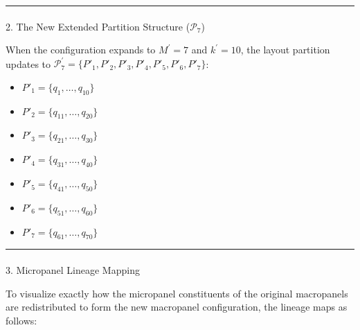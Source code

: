 \documentclass[
  number]{elsarticle}
\makeatletter
\let\oldparagraph\paragraph
\renewcommand{\paragraph}{
    \@ifstar
      \xxxParagraphStar
      \xxxParagraphNoStar
  }
\newcommand{\xxxParagraphStar}[1]{\oldparagraph*{#1}\mbox{}}
\newcommand{\xxxParagraphNoStar}[1]{\oldparagraph{#1}\mbox{}}
\providecommand{\tightlist}{%
  \setlength{\itemsep}{0pt}\setlength{\parskip}{0pt}}
\makeatother
\begin{document}
\begin{center}\rule{0.5\linewidth}{0.5pt}\end{center}

\paragraph{\texorpdfstring{2. The New Extended Partition Structure
(\(\mathcal{P}_{7}\))}{2. The New Extended Partition Structure (\textbackslash mathcal\{P\}\_\{7\})}}\label{the-new-extended-partition-structure-mathcalp_7}

When the configuration expands to \(M^\prime = 7\) and
\(k^\prime = 10\), the layout partition updates to
\(\mathcal{P}^\prime_7 = \{P'_1, P'_2, P'_3, P'_4, P'_5, P'_6, P'_7\}\):

\begin{itemize}
\tightlist
\item
  \(P'_1 = \{q_1, \dots, q_{10}\}\)
\item
  \(P'_2 = \{q_{11}, \dots, q_{20}\}\)
\item
  \(P'_3 = \{q_{21}, \dots, q_{30}\}\)
\item
  \(P'_4 = \{q_{31}, \dots, q_{40}\}\)
\item
  \(P'_5 = \{q_{41}, \dots, q_{50}\}\)
\item
  \(P'_6 = \{q_{51}, \dots, q_{60}\}\)
\item
  \(P'_7 = \{q_{61}, \dots, q_{70}\}\)
\end{itemize}

\begin{center}\rule{0.5\linewidth}{0.5pt}\end{center}

\paragraph{3. Micropanel Lineage
Mapping}\label{micropanel-lineage-mapping}

To visualize exactly how the micropanel constituents of the original
macropanels are redistributed to form the new macropanel configuration,
the lineage maps as follows:
\end{document}
